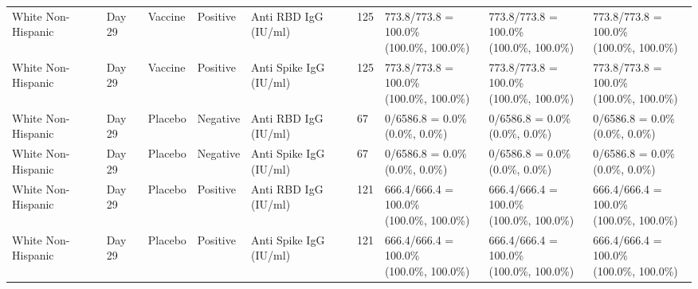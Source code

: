 \documentclass[]{book}
\theoremstyle{definition}
\theoremstyle{definition}
\theoremstyle{definition}
\newcommand{\1}{\mathbbm{1}}
\begin{document}
\begin{landscape}
\begin{ThreePartTable}
\begin{longtable}[t]{>{\raggedright\arraybackslash}p{2.7cm}llllllll}
\hspace{1em}White Non-Hispanic & Day 29 & Vaccine & Positive & Anti RBD IgG (IU/ml) & 125 & \makecell[l]{773.8/773.8 = 100.0\%\\(100.0\%, 100.0\%)} & \makecell[l]{773.8/773.8 = 100.0\%\\(100.0\%, 100.0\%)} & \makecell[l]{773.8/773.8 = 100.0\%\\(100.0\%, 100.0\%)}\\
\hspace{1em}White Non-Hispanic & Day 29 & Vaccine & Positive & Anti Spike IgG (IU/ml) & 125 & \makecell[l]{773.8/773.8 = 100.0\%\\(100.0\%, 100.0\%)} & \makecell[l]{773.8/773.8 = 100.0\%\\(100.0\%, 100.0\%)} & \makecell[l]{773.8/773.8 = 100.0\%\\(100.0\%, 100.0\%)}\\
\hspace{1em}White Non-Hispanic & Day 29 & Placebo & Negative & Anti RBD IgG (IU/ml) & 67 & \makecell[l]{0/6586.8 = 0.0\%\\(0.0\%, 0.0\%)} & \makecell[l]{0/6586.8 = 0.0\%\\(0.0\%, 0.0\%)} & \makecell[l]{0/6586.8 = 0.0\%\\(0.0\%, 0.0\%)}\\
\hspace{1em}White Non-Hispanic & Day 29 & Placebo & Negative & Anti Spike IgG (IU/ml) & 67 & \makecell[l]{0/6586.8 = 0.0\%\\(0.0\%, 0.0\%)} & \makecell[l]{0/6586.8 = 0.0\%\\(0.0\%, 0.0\%)} & \makecell[l]{0/6586.8 = 0.0\%\\(0.0\%, 0.0\%)}\\
\hspace{1em}White Non-Hispanic & Day 29 & Placebo & Positive & Anti RBD IgG (IU/ml) & 121 & \makecell[l]{666.4/666.4 = 100.0\%\\(100.0\%, 100.0\%)} & \makecell[l]{666.4/666.4 = 100.0\%\\(100.0\%, 100.0\%)} & \makecell[l]{666.4/666.4 = 100.0\%\\(100.0\%, 100.0\%)}\\
\hspace{1em}White Non-Hispanic & Day 29 & Placebo & Positive & Anti Spike IgG (IU/ml) & 121 & \makecell[l]{666.4/666.4 = 100.0\%\\(100.0\%, 100.0\%)} & \makecell[l]{666.4/666.4 = 100.0\%\\(100.0\%, 100.0\%)} & \makecell[l]{666.4/666.4 = 100.0\%\\(100.0\%, 100.0\%)}\\

\end{longtable}
\end{ThreePartTable}
\end{landscape}
\end{document}
